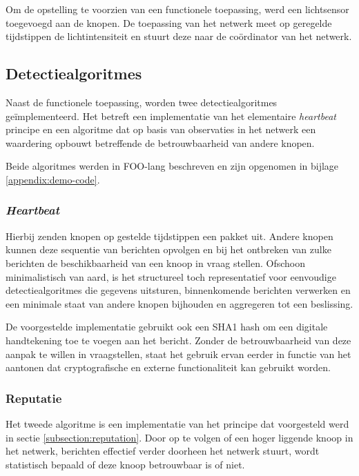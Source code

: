 Om de opstelling te voorzien van een functionele toepassing, werd een
lichtsensor toegevoegd aan de knopen. De toepassing van het netwerk meet op
geregelde tijdstippen de lichtintensiteit en stuurt deze naar de co\"ordinator
van het netwerk.

\subsection{Detectiealgoritmes}
\label{subsection:eval-algorithms}

Naast de functionele toepassing, worden twee detectiealgoritmes
ge\"implementeerd. Het betreft een implementatie van het elementaire
\emph{heartbeat} principe en een algoritme dat op basis van observaties in het
netwerk een waardering opbouwt betreffende de betrouwbaarheid van andere knopen.

Beide algoritmes werden in FOO-lang beschreven en zijn opgenomen in bijlage
\ref{appendix:demo-code}.

\subsubsection{\emph{Heartbeat}}

Hierbij zenden knopen op gestelde tijdstippen een
pakket uit. Andere knopen kunnen deze sequentie van berichten opvolgen en bij
het ontbreken van zulke berichten de beschikbaarheid van een knoop in vraag
stellen. Ofschoon minimalistisch van aard, is het structureel toch
representatief voor eenvoudige detectiealgoritmes die gegevens uitsturen,
binnenkomende berichten verwerken en een minimale staat van andere knopen
bijhouden en aggregeren tot een beslissing.

De voorgestelde implementatie gebruikt ook een SHA1 hash \citep{rfc:3174} om
een digitale handtekening toe te voegen aan het bericht. Zonder de
betrouwbaarheid van deze aanpak te willen in vraagstellen, staat het gebruik
ervan eerder in functie van het aantonen dat cryptografische en externe
functionaliteit kan gebruikt worden.

\subsubsection{Reputatie}

Het tweede algoritme is een implementatie van het principe dat voorgesteld werd
in sectie \ref{subsection:reputation}. Door op te volgen of een hoger liggende
knoop in het netwerk, berichten effectief verder doorheen het netwerk stuurt,
wordt statistisch bepaald of deze knoop betrouwbaar is of niet.

